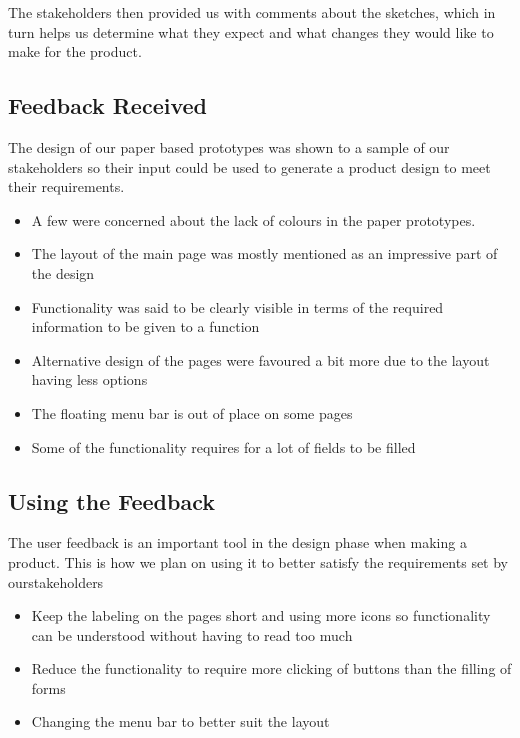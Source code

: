 \documentclass[11pt]{article}
\begin{document}
		The stakeholders then provided us with comments about the sketches, which in turn helps us determine what they expect and what changes they would like to make for the product.
	
	\subsection{Feedback Received}
		The design of our paper based prototypes was shown to a sample of our stakeholders so their input could be used to generate a product design to meet their requirements.
		\begin{itemize}
			\item A few were concerned about the lack of colours in the paper prototypes.
			\item The layout of the main page was mostly mentioned as an impressive part of the design
			\item Functionality was said to be clearly visible in terms of the required information to be given to a function
			\item Alternative design of the pages were favoured a bit more due to the layout having less options
			\item The floating menu bar is out of place on some pages
			\item Some of the functionality requires for a lot of fields to be filled
		\end{itemize}
		
	\subsection{Using the Feedback}
		The user feedback is an important tool in the design phase when making a product. This is how we plan on using it to better satisfy the requirements set by ourstakeholders
		\begin{itemize}
			\item Keep the labeling on the pages short and using more icons so functionality can be understood without having to read too much	
			\item Reduce the functionality to require more clicking of buttons than the filling of forms
			\item Changing the menu bar to better suit the layout
		\end{itemize}
\end{document}
